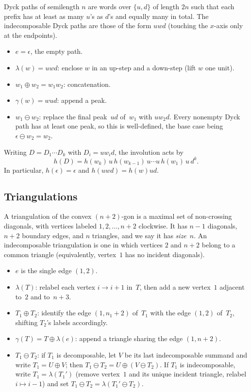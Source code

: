 \documentclass[a4paper,11pt]{article}
\theoremstyle{definition}
\begin{document}
Dyck paths of semilength $n$ are words over $\{u,d\}$ of
length $2n$ such that each prefix has at least as many
$u$'s as $d$'s and equally many in total.
The indecomposable Dyck paths are those of the form $uwd$
(touching the $x$-axis only at the endpoints).
\begin{itemize}
\item $e = \epsilon$, the empty path.
\item $\lambda(w) = uwd$: enclose $w$ in an up-step and
  a down-step (lift $w$ one unit).
\item $w_1 \oplus w_2 = w_1 w_2$: concatenation.
\item $\gamma(w) = wud$: append a peak.
\item $w_1 \ominus w_2$: replace the final peak~$ud$ of~$w_1$ with
  $uw_2d$. Every nonempty Dyck path has at least one peak, so this is
  well-defined, the base case being $\epsilon \ominus w_2 = w_2$.
\end{itemize}

Writing $D = D_1 \cdots D_k$ with $D_i = u w_i d$,
the involution acts by
\[
  h(D) = h(w_k)\, u\, h(w_{k-1})\, u
    \cdots u\, h(w_1)\, u\, d^k.
\]
In particular, $h(\epsilon) = \epsilon$ and
$h(uwd) = h(w) ud$.

\subsection{Triangulations}\label{sec:tri}

A triangulation of the convex $(n{+}2)$-gon is a maximal
set of non-crossing diagonals, with vertices labeled
$1, 2, \ldots, n{+}2$ clockwise. It has $n{-}1$
diagonals, $n{+}2$ boundary edges, and $n$ triangles, and we say it has \emph{size}~$n$.
An indecomposable triangulation is one in which vertices
$2$ and $n{+}2$ belong to a common triangle
(equivalently, vertex~$1$ has no incident diagonals).
\begin{itemize}
\item $e$ is the single edge $(1,2)$.
\item $\lambda(T)$: relabel each vertex $i \to i{+}1$
  in~$T$, then add a new vertex~$1$ adjacent to~$2$
  and to~$n{+}3$.
\item $T_1 \oplus T_2$: identify the edge
  $(1, n_1{+}2)$ of~$T_1$ with the edge $(1,2)$
  of~$T_2$, shifting $T_2$'s labels accordingly.
\item $\gamma(T) = T \oplus \lambda(e)$: append a
  triangle sharing the edge $(1, n{+}2)$.
\item $T_1 \ominus T_2$: if $T_1$ is decomposable, let $V$
  be its last indecomposable summand and write
  $T_1 = U \oplus V$; then
  $T_1 \ominus T_2 = U \oplus (V \ominus T_2)$. If $T_1$
  is indecomposable, write $T_1 = \lambda(T_1')$ (remove
  vertex~$1$ and its unique incident triangle, relabel
  $i \mapsto i{-}1$) and set
  $T_1 \ominus T_2 = \lambda(T_1' \ominus T_2)$.
\end{itemize}
\end{document}
